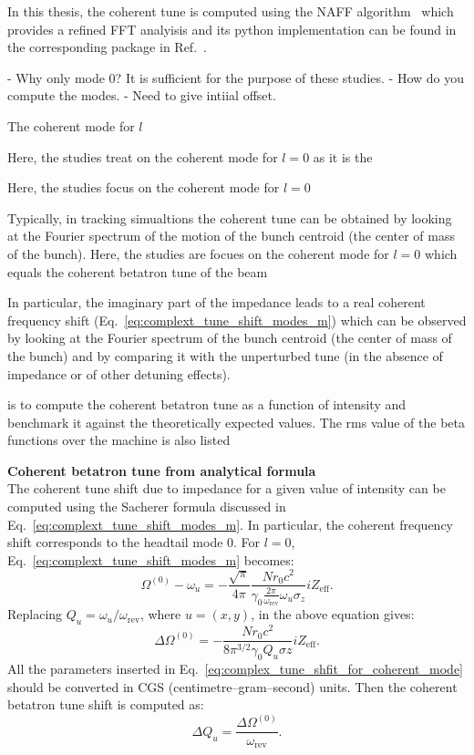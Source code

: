 In this thesis, the coherent tune is computed using the NAFF algorithm~\cite{LASKAR1990266, Kostoglou:2289645} which provides a refined FFT analyisis and its python implementation can be found in the corresponding package in Ref.~\cite{nafflib_repository}.






- Why only mode 0? It is sufficient for the purpose of these studies.
- How do you compute the modes.
- Need to give intiial offset.

The coherent mode for $l$


Here, the studies treat on the coherent mode for $l=0$ as it is the 


 Here, the studies focus on the coherent mode for $l=0$





Typically, in tracking simualtions the coherent tune can be obtained by looking at the Fourier spectrum of the motion of the bunch centroid (the center of mass of the bunch). Here, the studies are focues on the coherent mode for $l=0$ which equals the coherent betatron tune of the beam


In particular, the imaginary part of the impedance leads to a real coherent frequency shift (Eq.~\eqref{eq:complext_tune_shift_modes_m}) which can be observed by looking at the Fourier spectrum of the bunch centroid (the center of mass of the bunch) and by comparing it with the unperturbed tune (in the absence of impedance or of other detuning effects).


is to compute the coherent betatron tune as a function of intensity and benchmark it against the theoretically expected values. The rms value of the beta functions over the machine is also listed 

\textbf{Coherent betatron tune from analytical formula}\\
The coherent tune shift due to impedance for a given value of intensity can be computed using the Sacherer formula discussed in Eq.~\eqref{eq:complext_tune_shift_modes_m}. In particular, the coherent frequency shift corresponds to the headtail mode 0. For $l=0$, Eq.~\eqref{eq:complext_tune_shift_modes_m} becomes:
\begin{equation}
    \Omega^{(0)} - \omega_u = - \frac{\sqrt{\pi}}{4 \pi}\frac{N r_0 c^2}{\gamma_0 \frac{2\pi}{\omega_\mathrm{rev}}\omega_u \sigma_z} i Z_\mathrm{eff}.
\end{equation}
Replacing $Q_u = \omega_u/\omega_\mathrm{rev}$, where $u=(x,y)$, in the above equation gives:
\begin{equation}\label{eq:complex_tune_shfit_for_coherent_mode}
    \Delta \Omega^{(0)} = - \frac{N r_0 c^2}{8 \pi^{3/2} \gamma_0 Q_u \sigma z} i Z_\mathrm{eff}.
\end{equation}
All the parameters inserted in Eq.~\eqref{eq:complex_tune_shfit_for_coherent_mode} should be converted in CGS (centimetre–gram–second) units.
Then the coherent betatron tune shift is computed as:
\begin{equation}
    \Delta Q_u = \frac{\Delta \Omega^{(0)}}{\omega_\mathrm{rev}}.
\end{equation}

